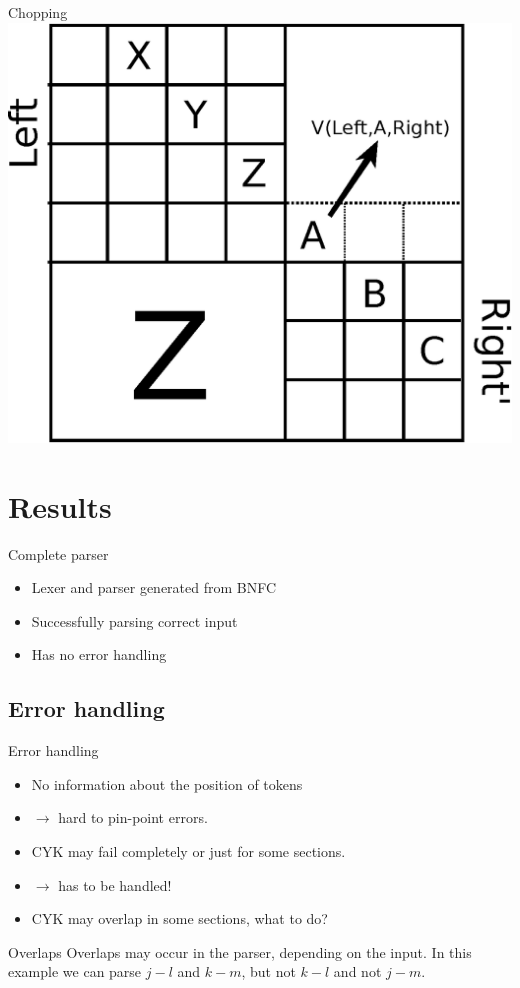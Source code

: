 \documentclass{beamer}
\newcommand{\subt}[3] { 
  \draw[grid] (#1,#1) -- (#1,#2) node[inChart] {#3} -- (#2,#2);
  \fill[color=black] (#1,#2) circle (2pt)
 }
\newcommand{\mrk}[2]{\node[inChart] at (#1,#1) {#2}}
\begin{document}
\begin{frame}{Chopping}
    \centering
    \includegraphics[width=.5\textwidth]{merge-with-chopping.eps}
\end{frame}

\section{Results}
\begin{frame}{Complete parser}
    \begin{itemize}
        \item Lexer and parser generated from BNFC
        \item Successfully parsing correct input
        \item Has no error handling
    \end{itemize}
\end{frame}

\subsection{Error handling}
\begin{frame}{Error handling}
    \begin{itemize}
        \item No information about the position of tokens 
        \item $\rightarrow$ hard to pin-point errors.
        \item CYK may fail completely or just for some sections.
        \item $\rightarrow$ has to be handled!
        \item CYK may overlap in some sections, what to do?
    \end{itemize}
\end{frame}

\begin{frame}{Overlaps}
    Overlaps may occur in the parser, depending on the input. In this example we
    can parse $j-l$ and $k-m$, but not $k-l$ and not $j-m$.

\end{frame}
\end{document}

